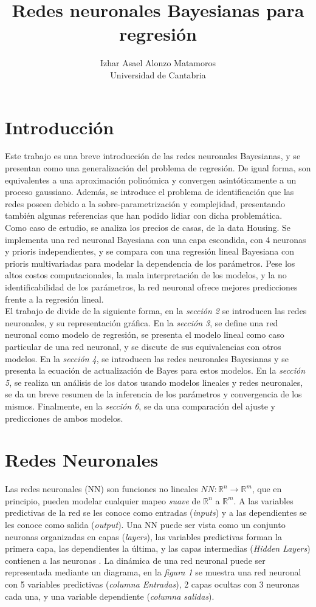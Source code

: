 \documentclass[nojss]{jss}
\author{Izhar Asael Alonzo Matamoros \\  Universidad de Cantabria \\}
\title{\huge Redes neuronales Bayesianas para regresión}
\begin{document}
\section{Introducción}
Este trabajo es una breve introducción de las redes neuronales Bayesianas, y se presentan como una generalización del problema de regresión. De igual forma, son equivalentes a una aproximación polinómica y convergen asintóticamente a un proceso gaussiano. Además, se introduce el problema de identificación que las redes poseen debido a la sobre-parametrización y complejidad, presentando también algunas referencias que han podido lidiar con dicha problemática.\\

Como caso de estudio, se analiza los precios de casas, de la data Housing. Se implementa una red neuronal Bayesiana con una capa escondida, con 4 neuronas y prioris independientes, y se compara con una regresión lineal Bayesiana con prioris multivariadas para modelar la dependencia de los parámetros. Pese los altos costos computacionales, la mala interpretación de los modelos, y la no identificabilidad de los parámetros, la red neuronal ofrece mejores predicciones frente a la regresión lineal.\\

El trabajo de divide de la siguiente forma, en la \textit{sección 2} se introducen las redes neuronales, y su representación gráfica. En la \textit{sección 3}, se define una red neuronal como modelo de regresión, se presenta el modelo lineal como caso particular de una red neuronal, y se discute de sus equivalencias con otros modelos. En la \textit{sección 4}, se introducen las redes neuronales Bayesianas y se presenta la ecuación de actualización de Bayes para estos modelos. En la \textit{sección 5}, se realiza un análisis de los datos usando modelos lineales y redes neuronales, se da un breve resumen de la inferencia de los parámetros y convergencia de los mismos. Finalmente, en la \textit{sección 6}, se da una comparación del ajuste y predicciones de ambos modelos.
  
\section{Redes Neuronales}

Las redes neuronales (NN) son funciones no lineales $NN:\mathbb{R}^n \rightarrow \mathbb{R}^m$, que en principio, pueden modelar cualquier mapeo \textit{suave} de  $\mathbb{R}^n$ a $\mathbb{R}^m$. A las variables predictivas de la red se les conoce como entradas (\textit{inputs}) y a las  dependientes se les conoce como salida (\textit{output}). Una NN puede ser vista como un conjunto neuronas organizadas en capas (\textit{layers}), las variables predictivas forman la primera capa, las dependientes la  última, y las capas intermedias (\textit{Hidden Layers}) contienen a las neuronas \cite{Paige2001}. La dinámica de una red neuronal puede ser representada mediante un diagrama, en la \textit{figura 1} se muestra una red neuronal con 5 variables predictivas (\textit{columna Entradas}), 2 capas ocultas con 3 neuronas cada una, y una variable dependiente (\textit{columna salidas}).
\end{document}
